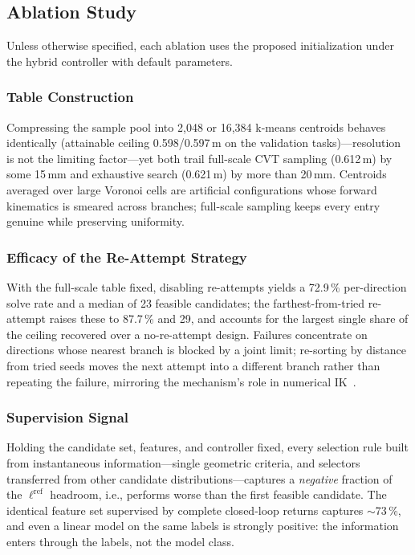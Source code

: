 \documentclass[journal]{IEEEtran}
\begin{document}
\subsection{Ablation Study}
\label{sec:abl}
Unless otherwise specified, each ablation uses the proposed
initialization under the hybrid controller with default parameters.

\subsubsection{Table Construction}
\label{sec:abl-table}
Compressing the sample pool into 2{,}048 or 16{,}384 k-means centroids
behaves identically (attainable ceiling 0.598/0.597\,m on the
validation tasks)---resolution is not the limiting factor---yet both
trail full-scale CVT sampling (0.612\,m) by some 15\,mm and exhaustive
search (0.621\,m) by more than 20\,mm. Centroids averaged over large
Voronoi cells are artificial configurations whose forward kinematics is
smeared across branches; full-scale sampling keeps every entry genuine
while preserving uniformity.

\subsubsection{Efficacy of the Re-Attempt Strategy}
\label{sec:abl-retry}
With the full-scale table fixed, disabling re-attempts yields a
72.9\,\% per-direction solve rate and a median of 23 feasible
candidates; the farthest-from-tried re-attempt raises these to
87.7\,\% and 29, and accounts for the largest single share of the
ceiling recovered over a no-re-attempt design. Failures concentrate on
directions whose nearest branch is blocked by a joint limit; re-sorting
by distance from tried seeds moves the next attempt into a different
branch rather than repeating the failure, mirroring the mechanism's
role in numerical IK~\cite{yuan2026iksel}.

\subsubsection{Supervision Signal}
\label{sec:abl-sup}
Holding the candidate set, features, and controller fixed, every
selection rule built from instantaneous information---single geometric
criteria, and selectors transferred from other candidate
distributions---captures a \textit{negative} fraction of the
$\ell^{\mathrm{ref}}$ headroom, i.e., performs worse than the first
feasible candidate. The identical feature set supervised by complete
closed-loop returns captures $\sim$73\,\%, and even a linear model
on the same labels is strongly positive: the information enters through
the labels, not the model class.
\end{document}
